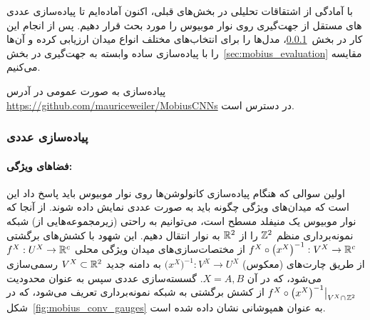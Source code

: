 با آمادگی از اشتقاقات تحلیلی در بخش‌های قبلی، اکنون آماده‌ایم تا پیاده‌سازی عددی \CNN های مستقل از جهت‌گیری روی نوار موبیوس را مورد بحث قرار دهیم.
پس از انجام این کار در بخش~\ref{sec:mobius_implementation}، مدل‌ها را برای انتخاب‌های مختلف انواع میدان ارزیابی کرده و آن‌ها را با پیاده‌سازی ساده وابسته به جهت‌گیری در بخش~\ref{sec:mobius_evaluation} مقایسه می‌کنیم.

پیاده‌سازی به صورت عمومی در آدرس \url{https://github.com/mauriceweiler/MobiusCNNs} در دسترس است.

\subsubsection{پیاده‌سازی عددی}
\label{sec:mobius_implementation}

\paragraph{فضاهای ویژگی:}
اولین سوالی که هنگام پیاده‌سازی کانولوشن‌ها روی نوار موبیوس باید پاسخ داد این است که میدان‌های ویژگی چگونه باید به صورت عددی نمایش داده شوند.
از آنجا که نوار موبیوس یک منیفلد مسطح است، می‌توانیم به راحتی (زیرمجموعه‌هایی از) شبکه نمونه‌برداری منظم $\mathbb{Z}^2$ را از $\mathbb{R}^2$ به نوار انتقال دهیم.
این شهود با کشش‌های برگشتی
$f^X\circ \big(x^X\big)^{-1}: V^X \to \mathbb{R}^c$
از مختصات‌سازی‌های میدان ویژگی محلی
$f^X: U^X \to \mathbb{R}^c$
از طریق چارت‌های (معکوس)
$\big(x^X\big)^{-1}: V^X \to U^X$
به دامنه جدید $V^X \subset \mathbb{R}^2$ رسمی‌سازی می‌شود،
که در آن $X=A,B$.
گسسته‌سازی عددی سپس به عنوان محدودیت
$f^X\circ \big(x^X\big)^{-1} \big|_{V^X\cap\mkern2mu\mathbb{Z}^2}$
از کشش برگشتی به شبکه نمونه‌برداری تعریف می‌شود، که در شکل~\ref{fig:mobius_conv_gauges} به عنوان همپوشانی نشان داده شده است.


